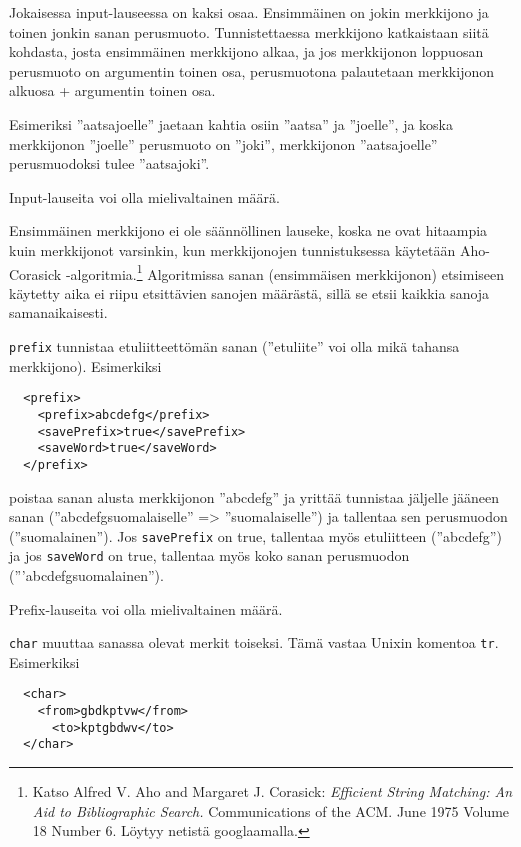 \documentclass[12pt]{article}
\begin{document}
Jokaisessa input-lauseessa on kaksi osaa. Ensimmäinen on jokin
merkkijono ja toinen jonkin sanan perusmuoto. Tunnistettaessa
merkkijono katkaistaan siitä kohdasta, josta ensimmäinen merkkijono
alkaa, ja jos merkkijonon loppuosan perusmuoto on argumentin toinen
osa, perusmuotona palautetaan merkkijonon alkuosa + argumentin toinen
osa.

Esimeriksi ''aatsajoelle'' jaetaan kahtia osiin ''aatsa'' ja
''joelle'', ja koska merkkijonon ''joelle'' perusmuoto on ''joki'',
merkkijonon ''aatsajoelle'' perusmuodoksi tulee ''aatsajoki''.

Input-lauseita voi olla mielivaltainen määrä.

Ensimmäinen merkkijono ei ole säännöllinen lauseke, koska ne ovat
hitaampia kuin merkkijonot varsinkin, kun merkkijonojen tunnistuksessa
käytetään Aho-Corasick -algoritmia.\footnote{Katso
Alfred V. Aho and Margaret J. Corasick:
\emph{Efficient String Matching: An Aid to Bibliographic Search.}
Communications of the ACM. June 1975 Volume 18 Number 6.
Löytyy netistä googlaamalla.} Algoritmissa sanan (ensimmäisen
merkkijonon) etsimiseen käytetty aika ei riipu etsittävien sanojen
määrästä, sillä se etsii kaikkia sanoja samanaikaisesti.



\bigskip
\verb|prefix| tunnistaa etuliitteettömän sanan (''etuliite'' voi olla
mikä tahansa merkkijono). Esimerkiksi

\begin{verbatim}
  <prefix>
    <prefix>abcdefg</prefix>
    <savePrefix>true</savePrefix>
    <saveWord>true</saveWord>
  </prefix>
\end{verbatim}

poistaa sanan alusta merkkijonon ''abcdefg'' ja yrittää tunnistaa
jäljelle jääneen sanan (''abcdefgsuomalaiselle'' => ''suomalaiselle'')
ja tallentaa sen perusmuodon (''suomalainen''). Jos \verb|savePrefix|
on true, tallentaa myös etuliitteen (''abcdefg'') ja jos
\verb|saveWord| on true, tallentaa myös koko sanan perusmuodon
('''abcdefgsuomalainen'').

Prefix-lauseita voi olla mielivaltainen määrä.



\bigskip
\verb|char| muuttaa sanassa olevat merkit toiseksi. Tämä vastaa Unixin
komentoa \verb|tr|. Esimerkiksi

\begin{verbatim}
  <char>
    <from>gbdkptvw</from>
      <to>kptgbdwv</to>
  </char>
\end{verbatim}
\end{document}
